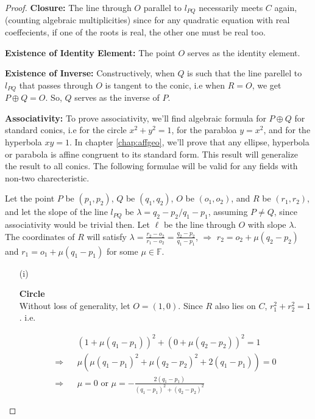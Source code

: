 \begin{proof}\textbf{Closure:} The line through $O$ parallel to $l_{PQ}$ necessarily meets $C$
  again, (counting algebraic multiplicities) since for any quadratic equation with real 
  coeffecients, if one of the roots is real, the other one must be real too. \vspace{10pt}

  \textbf{Existence of Identity Element:} The point $O$ serves as the identity element.\vspace{10pt}

  \textbf{Existence of Inverse:} Constructively, when $Q$ is such that the line parellel to
  $l_{PQ}$ that passes through $O$ is tangent to the conic, i.e when $R=O$, we get
  $P\oplus Q=O$. So, $Q$ serves as the inverse of $P$. \vspace{10pt}

  \textbf{Associativity:} To prove associativity, we'll find algebraic formula for $P\oplus Q$
  for standard conics, i.e for the circle $x^2+y^2=1$, for the parabloa $y=x^2$, and for the
  hyperbola $xy=1$. In chapter \ref{chap:affgeo}, we'll prove that any ellipse, hyperbola or
  parabola is affine congruent to its standard form. This result will generalize the result to
  all conics. The following formulae will be valid for any fields with non-two charecteristic.

  Let the point $P$ be $(p_1,p_2)$, $Q$ be $(q_1,q_2)$, $O$ be $(o_1,o_2)$, and $R$ be
  $(r_1,r_2)$, and let the slope of the line $l_{PQ}$ be $\lambda=q_2-p_2/q_1-p_1$, assuming
  $P\not=Q$, since associativity would be trivial then. Let $\ell$ be the line through $O$
  with slope $\lambda$. The coordinates of $R$ will satisfy
  $\lambda=\frac{r_2-o_2}{r_1-o_2}=\frac{q_2-p_2}{q_1-p_1}$,
  $\Rightarrow$ $r_2=o_2+\mu(q_2-p_2)$ and $r_1=o_1+\mu(q_1-p_1)$ for some $\mu\in\mathbb{F}$.

  \begin{itemize}
    \item[(i)]{
        \textbf{Circle}\\
        Without loss of generality, let $O=(1,0)$. Since $R$ also lies on $C$,
        $r_1^2+r_2^2=1$. i.e.

        \begin{eqnarray*}
          &&(1+\mu(q_1-p_1))^2+(0+\mu(q_2-p_2))^2=1\\
          \Longrightarrow&& \mu(\mu(q_1-p_1)^2+\mu(q_2-p_2)^2+2(q_1-p_1))=0\\
          \Longrightarrow&& \mu=0\text{ or }\mu=-\frac{2(q_1-p_1)}{(q_1-p_1)^2+(q_2-p_2)^2}
        \end{eqnarray*}

}
\end{itemize}
\end{proof}
